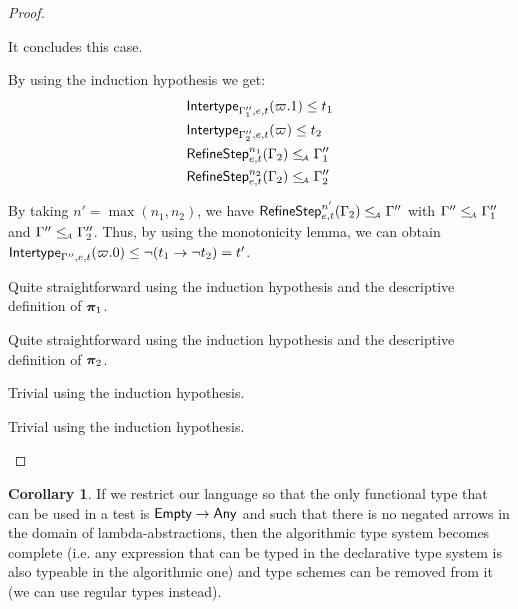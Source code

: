 \documentclass[a4paper]{article}
\theoremstyle{definition}
\newtheorem{corollary}{Corollary}
\begin{document}
\begin{proof}
\begin{description}
\begin{description}
      It concludes this case.

      \item[\Rule{PAppL}] By using the induction hypothesis we get:
      \begin{align*}
        &\textsf{Intertype}_{\Gamma_1'',e,t} (\varpi.1) \leq t_1\\
        &\textsf{Intertype}_{\Gamma_2'',e,t} (\varpi) \leq t_2\\
        &\textsf{RefineStep}_{e,t}^{n_1} (\Gamma_2) \leq_{\!\scriptscriptstyle\mathcal{A}} \Gamma_1''\\
        &\textsf{RefineStep}_{e,t}^{n_2} (\Gamma_2) \leq_{\!\scriptscriptstyle\mathcal{A}} \Gamma_2''
      \end{align*}

      By taking $n'=\max (n_1,n_2)$,
      we have $\textsf{RefineStep}_{e,t}^{n'} (\Gamma_2) \leq_{\!\scriptscriptstyle\mathcal{A}} \Gamma''$ with $\Gamma'' \leq_{\!\scriptscriptstyle\mathcal{A}} \Gamma_1''$ and $\Gamma'' \leq_{\!\scriptscriptstyle\mathcal{A}} \Gamma_2''$.
      Thus, by using the monotonicity lemma, we can obtain $\textsf{Intertype}_{\Gamma'',e,t} (\varpi.0) \leq \neg (t_1\to \neg t_2) = t'$.
  
      \item[\Rule{PPairL}] Quite straightforward using the induction hypothesis and the descriptive definition of $\boldsymbol{\pi}_1$.
      \item[\Rule{PPairR}] Quite straightforward using the induction hypothesis and the descriptive definition of $\boldsymbol{\pi}_2$.
      \item[\Rule{PFst}] Trivial using the induction hypothesis.
      \item[\Rule{PSnd}] Trivial using the induction hypothesis.
    \end{description}
  \end{description}
  \end{proof}

  \begin{corollary}\label{app:completeness}
    If we restrict our language so that the only functional type that can be used in a test is $\textsf{Empty}\to \textsf{Any}$
    and such that there is no negated arrows in the domain of lambda-abstractions,
    then the algorithmic type system becomes complete
    (i.e. any expression that can be typed in the declarative type system is also typeable in the algorithmic one)
    and type schemes can be removed from it (we can use regular types instead).
  \end{corollary}
\end{document}
